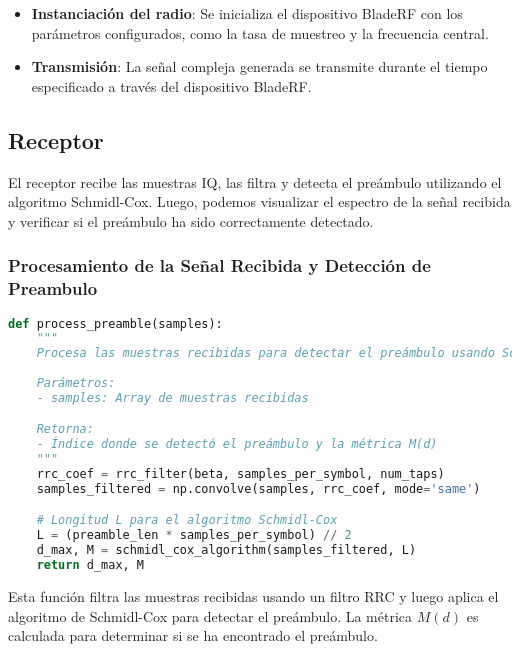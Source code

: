 \documentclass[letterpaper,12pt,oneside]{article}
\begin{document}
\begin{itemize}
    \item \textbf{Instanciación del radio}: Se inicializa el dispositivo BladeRF con los parámetros configurados, como la tasa de muestreo y la frecuencia central.
    \item \textbf{Transmisión}: La señal compleja generada se transmite durante el tiempo especificado a través del dispositivo BladeRF.
\end{itemize}

\subsection{Receptor}
El receptor recibe las muestras IQ, las filtra y detecta el preámbulo utilizando el algoritmo Schmidl-Cox. Luego, podemos visualizar el espectro de la señal recibida y verificar si el preámbulo ha sido correctamente detectado.

\subsubsection*{Procesamiento de la Señal Recibida y Detección de Preambulo}
\begin{tcolorbox}[title=\textbf{Función para Procesar la Señal Recibida y Detectar el Preambulo}, colframe=black, colback=white]
\begin{lstlisting}[language=Python]
def process_preamble(samples):
    """
    Procesa las muestras recibidas para detectar el preámbulo usando Schmidl-Cox.
    
    Parámetros:
    - samples: Array de muestras recibidas

    Retorna:
    - Índice donde se detectó el preámbulo y la métrica M(d)
    """
    rrc_coef = rrc_filter(beta, samples_per_symbol, num_taps)
    samples_filtered = np.convolve(samples, rrc_coef, mode='same')

    # Longitud L para el algoritmo Schmidl-Cox
    L = (preamble_len * samples_per_symbol) // 2
    d_max, M = schmidl_cox_algorithm(samples_filtered, L)
    return d_max, M
\end{lstlisting}
\end{tcolorbox}

Esta función filtra las muestras recibidas usando un filtro RRC y luego aplica el algoritmo de Schmidl-Cox para detectar el preámbulo. La métrica \(M(d)\) es calculada para determinar si se ha encontrado el preámbulo.
\end{document}
